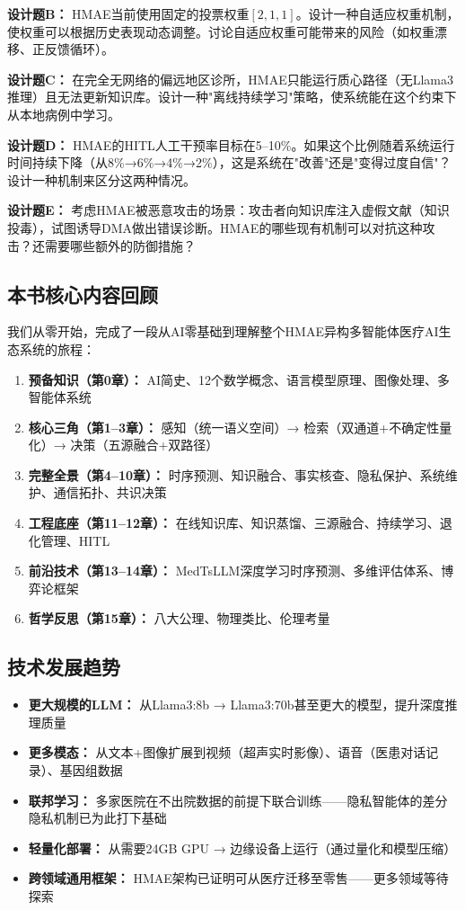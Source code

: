 \documentclass[11pt,a4paper]{ctexart}
\begin{document}
\textbf{设计题B：} HMAE当前使用固定的投票权重$[2,1,1]$。设计一种自适应权重机制，使权重可以根据历史表现动态调整。讨论自适应权重可能带来的风险（如权重漂移、正反馈循环）。

\textbf{设计题C：} 在完全无网络的偏远地区诊所，HMAE只能运行质心路径（无Llama3推理）且无法更新知识库。设计一种"离线持续学习"策略，使系统能在这个约束下从本地病例中学习。

\textbf{设计题D：} HMAE的HITL人工干预率目标在5--10\%。如果这个比例随着系统运行时间持续下降（从8\%→6\%→4\%→2\%），这是系统在"改善"还是"变得过度自信"？设计一种机制来区分这两种情况。

\textbf{设计题E：} 考虑HMAE被恶意攻击的场景：攻击者向知识库注入虚假文献（知识投毒），试图诱导DMA做出错误诊断。HMAE的哪些现有机制可以对抗这种攻击？还需要哪些额外的防御措施？




\subsection{本书核心内容回顾}

我们从零开始，完成了一段从AI零基础到理解整个HMAE异构多智能体医疗AI生态系统的旅程：

\begin{enumerate}[nosep]
\item \textbf{预备知识（第0章）：} AI简史、12个数学概念、语言模型原理、图像处理、多智能体系统
\item \textbf{核心三角（第1--3章）：} 感知（统一语义空间）→ 检索（双通道+不确定性量化）→ 决策（五源融合+双路径）
\item \textbf{完整全景（第4--10章）：} 时序预测、知识融合、事实核查、隐私保护、系统维护、通信拓扑、共识决策
\item \textbf{工程底座（第11--12章）：} 在线知识库、知识蒸馏、三源融合、持续学习、退化管理、HITL
\item \textbf{前沿技术（第13--14章）：} MedTsLLM深度学习时序预测、多维评估体系、博弈论框架
\item \textbf{哲学反思（第15章）：} 八大公理、物理类比、伦理考量
\end{enumerate}

\subsection{技术发展趋势}

\begin{itemize}[nosep]
\item \textbf{更大规模的LLM：} 从Llama3:8b → Llama3:70b甚至更大的模型，提升深度推理质量
\item \textbf{更多模态：} 从文本+图像扩展到视频（超声实时影像）、语音（医患对话记录）、基因组数据
\item \textbf{联邦学习：} 多家医院在不出院数据的前提下联合训练——隐私智能体的差分隐私机制已为此打下基础
\item \textbf{轻量化部署：} 从需要24GB GPU → 边缘设备上运行（通过量化和模型压缩）
\item \textbf{跨领域通用框架：} HMAE架构已证明可从医疗迁移至零售——更多领域等待探索
\end{itemize}
\end{document}

